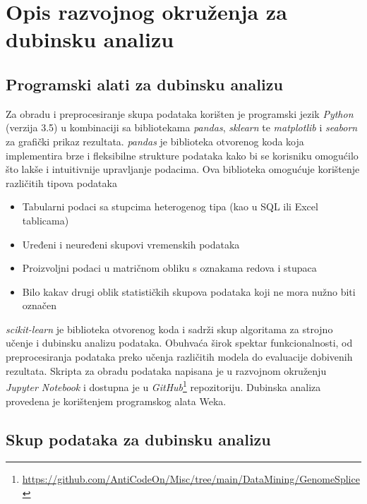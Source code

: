 \section{Opis razvojnog okruženja za dubinsku analizu}
\label{ch:ch2}

\subsection{Programski alati za dubinsku analizu}
Za obradu i preprocesiranje skupa podataka korišten je programski jezik \textit{Python} (verzija 3.5)
u kombinaciji sa bibliotekama \textit{pandas}, \textit{sklearn} te \textit{matplotlib} i \textit{seaborn} za grafički prikaz rezultata.
\textit{pandas} je biblioteka otvorenog koda koja implementira brze i fleksibilne strukture podataka kako bi se korisniku omogućilo što lakše i intuitivnije upravljanje podacima\cite{McKinney01}. Ova biblioteka omogućuje korištenje različitih tipova podataka
\begin{itemize}
   \item Tabularni podaci sa stupcima heterogenog tipa (kao u SQL ili Excel tablicama)
   \item Uređeni i neuređeni skupovi vremenskih podataka
   \item Proizvoljni podaci u matričnom obliku s oznakama redova i stupaca
   \item Bilo kakav drugi oblik statističkih skupova podataka koji ne mora nužno biti označen
\end{itemize}

\textit{scikit-learn} je biblioteka otvorenog koda i sadrži skup algoritama za strojno učenje i dubinsku analizu podataka\cite{Pedregosa01}. Obuhvaća širok spektar funkcionalnosti, od preprocesiranja podataka preko učenja različitih modela do evaluacije dobivenih rezultata.
Skripta za obradu podataka napisana je u razvojnom okruženju \textit{Jupyter Notebook} i dostupna je u \textit{GitHub}\footnote{\url{https://github.com/AntiCodeOn/Misc/tree/main/DataMining/GenomeSplice}} repozitoriju. Dubinska analiza provedena je korištenjem programskog alata Weka\cite{Weka01}.

\subsection{Skup podataka za dubinsku analizu}

